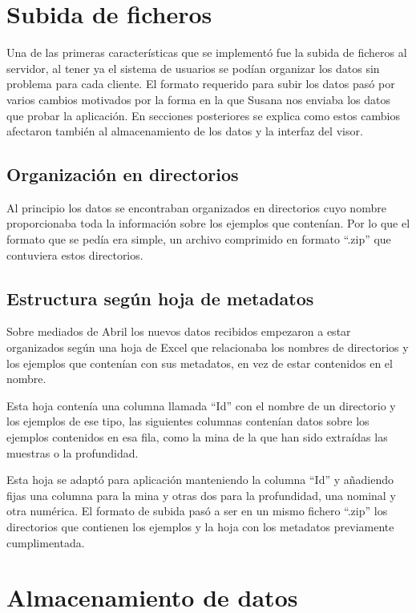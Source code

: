 \section{Subida de ficheros}\label{sec:subida}

Una de las primeras características que se implementó fue la subida de ficheros
al servidor, al tener ya el sistema de usuarios se podían organizar los datos
sin problema para cada cliente. El formato requerido para subir los datos pasó
por varios cambios motivados por la forma en la que Susana nos enviaba los datos
que probar la aplicación. En secciones posteriores se explica como estos cambios
afectaron también al almacenamiento de los datos y la interfaz del visor.

\subsection{Organización en directorios}\label{sec:directorios}

Al principio los datos se encontraban organizados en directorios cuyo nombre
proporcionaba toda la información sobre los ejemplos que contenían. Por lo que
el formato que se pedía era simple, un archivo comprimido en formato ``.zip''
que contuviera estos directorios.

\subsection{Estructura según hoja de metadatos}\label{sec:excel}

Sobre mediados de Abril los nuevos datos recibidos empezaron a estar organizados
según una hoja de Excel que relacionaba los nombres de directorios y los
ejemplos que contenían con sus metadatos, en vez de estar contenidos en el
nombre.

Esta hoja contenía una columna llamada ``Id'' con el nombre de un directorio y
los ejemplos de ese tipo, las siguientes columnas contenían datos sobre los
ejemplos contenidos en esa fila, como la mina de la que han sido extraídas las
muestras o la profundidad.

Esta hoja se adaptó para aplicación manteniendo la columna ``Id'' y añadiendo
fijas una columna para la mina y otras dos para la profundidad, una nominal y
otra numérica. El formato de subida pasó a ser en un mismo fichero ``.zip'' los
directorios que contienen los ejemplos y la hoja con los metadatos previamente
cumplimentada.

\section{Almacenamiento de datos}


